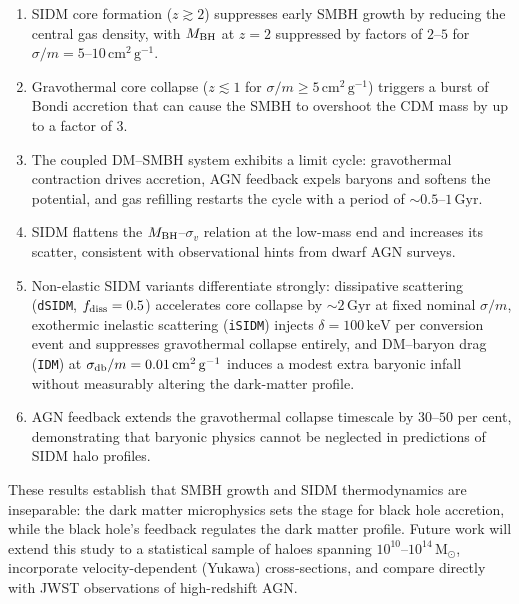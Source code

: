 \documentclass[fleqn,usenatbib]{mnras}
\newcommand{\code}[1]{\texttt{#1}}
\newcommand{\sigmam}{\sigma/m}
\newcommand{\Msun}{\mathrm{M_\odot}}
\newcommand{\Gyr}{\,\mathrm{Gyr}}
\newcommand{\MBH}{M_{\rm BH}}
\newcommand{\vdisp}{\sigma_v}
\begin{document}
\begin{enumerate}
  \item SIDM core formation ($z \gtrsim 2$) suppresses early SMBH
    growth by reducing the central gas density, with $\MBH$ at $z=2$
    suppressed by factors of $2$--$5$ for $\sigmam =
    5$--$10\,\mathrm{cm^2\,g^{-1}}$.

  \item Gravothermal core collapse ($z \lesssim 1$ for $\sigmam \ge
    5\,\mathrm{cm^2\,g^{-1}}$) triggers a burst of Bondi accretion
    that can cause the SMBH to overshoot the CDM mass by up to a
    factor of $3$.

  \item The coupled DM--SMBH system exhibits a limit cycle:
    gravothermal contraction drives accretion, AGN feedback expels
    baryons and softens the potential, and gas refilling restarts the
    cycle with a period of $\sim 0.5$--$1\Gyr$.

  \item SIDM flattens the $\MBH$--$\vdisp$ relation at the low-mass
    end and increases its scatter, consistent with observational hints
    from dwarf AGN surveys.

  \item Non-elastic SIDM variants differentiate strongly: dissipative
    scattering (\code{dSIDM}, $f_{\rm diss}=0.5$) accelerates core
    collapse by $\sim 2\Gyr$ at fixed nominal $\sigmam$, exothermic
    inelastic scattering (\code{iSIDM}) injects $\delta =
    100\,\mathrm{keV}$ per conversion event and suppresses
    gravothermal collapse entirely, and DM--baryon drag
    (\code{IDM}) at $\sigma_{\rm db}/m =
    0.01\,\mathrm{cm^2\,g^{-1}}$ induces a modest extra baryonic
    infall without measurably altering the dark-matter profile.

  \item AGN feedback extends the gravothermal collapse timescale by
    $30$--$50$ per cent, demonstrating that baryonic physics cannot be
    neglected in predictions of SIDM halo profiles.
\end{enumerate}

These results establish that SMBH growth and SIDM thermodynamics are
inseparable: the dark matter microphysics sets the stage for black
hole accretion, while the black hole's feedback regulates the dark
matter profile.  Future work will extend this study to a statistical
sample of haloes spanning $10^{10}$--$10^{14}\,\Msun$, incorporate
velocity-dependent (Yukawa) cross-sections, and compare directly with
JWST observations of high-redshift AGN.
\end{document}
